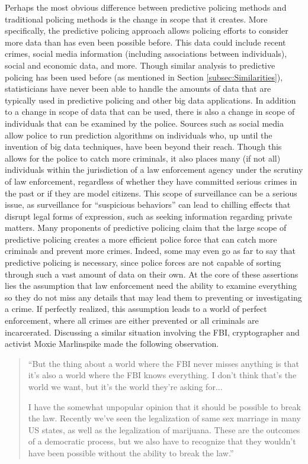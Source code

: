 \documentclass[12pt]{article} %
\begin{document}
Perhaps the most obvious difference between predictive policing methods and traditional policing methods is the change in scope that it creates. More specifically, the predictive policing approach allows policing efforts to consider more data than has even been possible before. This data could include recent crimes, social media information (including associations between individuals), social and economic data, and more. Though similar analysis to predictive policing has been used before (as mentioned in Section \ref{subsec:Similarities}), statisticians have never been able to handle the amounts of data that are typically used in predictive policing and other big data applications. In addition to a change in scope of data that can be used, there is also a change in scope of individuals that can be examined by the police. Sources such as social media allow police to run prediction algorithms on individuals who, up until the invention of big data techniques, have been beyond their reach. Though this allows for the police to catch more criminals, it also places many (if not all) individuals within the jurisdiction of a law enforcement agency under the scrutiny of law enforcement, regardless of whether they have committed serious crimes in the past or if they are model citizens. This scope of surveillance can be a serious issue, as surveillance for ``suspicious behaviors'' can lead to chilling effects that disrupt legal forms of expression, such as seeking information regarding private matters. \cite{penney2016chilling} Many proponents of predictive policing claim that the large scope of predictive policing creates a more efficient police force that can catch more criminals and prevent more crimes. \cite{pearsall2010predictive} Indeed, some may even go as far to say that predictive policing is necessary, since police forces are not capable of sorting through such a vast amount of data on their own. At the core of these assertions lies the assumption that law enforcement need the ability to examine everything so they do not miss any details that may lead them to preventing or investigating a crime. If perfectly realized, this assumption leads to a world of perfect enforcement, where all crimes are either prevented or all criminals are incarcerated. Discussing a similar situation involving the FBI, cryptographer and activist Moxie Marlinspike made the following observation. \cite{rosenblum_2016}

\begin{quote}
``But the thing about a world where the FBI never misses anything is that it's also a world where the FBI knows everything. I don't think that's the world we want, but it's the world they're asking for...

I have the somewhat unpopular opinion that it should be possible to break the law. Recently we've seen the legalization of same sex marriage in many US states, as well as the legalization of marijuana. These are the outcomes of a democratic process, but we also have to recognize that they wouldn't have been possible without the ability to break the law.''
\end{quote}
\end{document}

